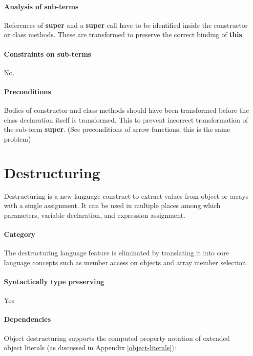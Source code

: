 \paragraph{Analysis of sub-terms}
References of \textbf{super} and a \textbf{super} call have to be identified inside the constructor or class methods. These are transformed to preserve the correct binding of \textbf{this}.

\paragraph{Constraints on sub-terms}
No.

\paragraph{Preconditions}
Bodies of constructor and class methods should have been transformed before the class declaration itself is transformed. This to prevent incorrect transformation of the sub-term \textbf{super}. (See preconditions of arrow functions, this is the same problem)

\section{Destructuring} \label{destructuring}
Destructuring\cite[12.14.5]{SpecJS} is a new language construct to extract values from object or arrays with a single assignment. It can be used in multiple places among which parameters, variable declaration, and expression assignment.

\paragraph{Category}
The destructuring language feature is eliminated by translating it into core language concepts such as member access on objects and array member selection.

\paragraph{Syntactically type preserving}
Yes

\paragraph{Dependencies}
Object destructuring supports the computed property notation of extended object literals (as discussed in Appendix \ref{object-literals}):

